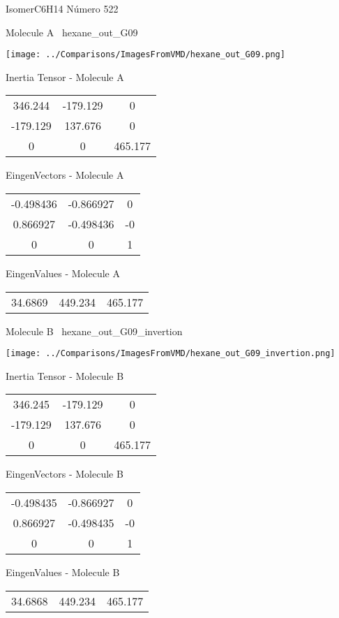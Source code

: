\vtab[-3cm]
\begin{center}
{\large IsomerC6H14 \tab Número 522}
\end{center}
\begin{multicols}{2}
\begin{center}

Molecule A \
hexane\_out\_G09

\texttt{[image: ../Comparisons/ImagesFromVMD/hexane\_out\_G09.png]}

Inertia Tensor - Molecule A \\
\begin{tabular}{|c c c|}
346.244	 & 	-179.129	 & 	0	 \\
-179.129	 & 	137.676	 & 	0	 \\
0	 & 	0	 & 	465.177
\end{tabular}

\vtab
 EingenVectors - Molecule A     \\
\begin{tabular}{|c c c|}
-0.498436	 & 	-0.866927	 & 	0	 \\
0.866927	 & 	-0.498436	 & 	-0	 \\
0	 & 	0	 & 	1
\end{tabular}

\vtab
 EingenValues - Molecule A     \\
\begin{tabular}{|c c c|}
34.6869	 & 	449.234	 & 	465.177	 \\
\end{tabular}
\columnbreak

Molecule B \
hexane\_out\_G09\_invertion

\texttt{[image: ../Comparisons/ImagesFromVMD/hexane\_out\_G09\_invertion.png]}

Inertia Tensor - Molecule B \\
\begin{tabular}{|c c c|}
346.245	 & 	-179.129	 & 	0	 \\
-179.129	 & 	137.676	 & 	0	 \\
0	 & 	0	 & 	465.177
\end{tabular}

\vtab
 EingenVectors - Molecule B     \\
\begin{tabular}{|c c c|}
-0.498435	 & 	-0.866927	 & 	0	 \\
0.866927	 & 	-0.498435	 & 	-0	 \\
0	 & 	0	 & 	1
\end{tabular}

\vtab
 EingenValues - Molecule B     \\
\begin{tabular}{|c c c|}
34.6868	 & 	449.234	 & 	465.177	 \\
\end{tabular}

\end{center}
\end{multicols}

